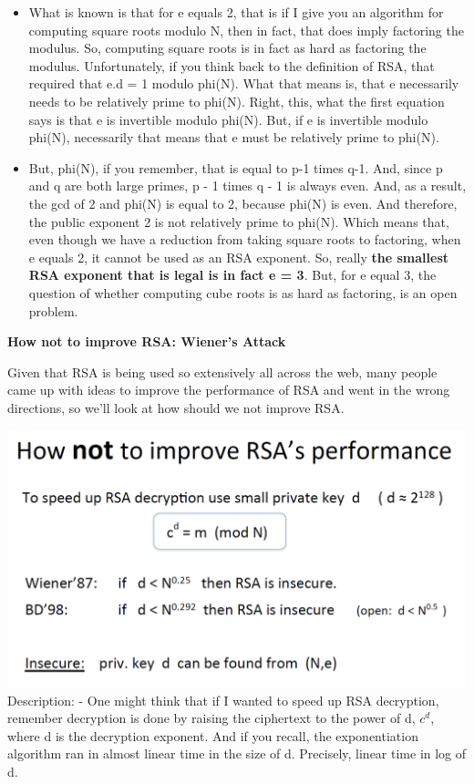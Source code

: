 \documentclass[11pt]{article}
\makeatletter
\def\maxwidth{\ifdim\Gin@nat@width>\linewidth\linewidth
    \else\Gin@nat@width\fi}
\let\Oldincludegraphics\includegraphics
\renewcommand{\includegraphics}[1]{\Oldincludegraphics[width=.8\maxwidth]{#1}}
\makeatother
\begin{document}
\begin{itemize}
\item
  What is known is that for e equals 2, that is if I give you an
  algorithm for computing square roots modulo N, then in fact, that does
  imply factoring the modulus. So, computing square roots is in fact as
  hard as factoring the modulus. Unfortunately, if you think back to the
  definition of RSA, that required that e.d = 1 modulo phi(N). What that
  means is, that e necessarily needs to be relatively prime to phi(N).
  Right, this, what the first equation says is that e is invertible
  modulo phi(N). But, if e is invertible modulo phi(N), necessarily that
  means that e must be relatively prime to phi(N).
\item
  But, phi(N), if you remember, that is equal to p-1 times q-1. And,
  since p and q are both large primes, p - 1 times q - 1 is always even.
  And, as a result, the gcd of 2 and phi(N) is equal to 2, because
  phi(N) is even. And therefore, the public exponent 2 is not relatively
  prime to phi(N). Which means that, even though we have a reduction
  from taking square roots to factoring, when e equals 2, it cannot be
  used as an RSA exponent. So, really \textbf{the smallest RSA exponent
  that is legal is in fact e = 3}. But, for e equal 3, the question of
  whether computing cube roots is as hard as factoring, is an open
  problem.
\end{itemize}

\textbf{How not to improve RSA: Wiener's Attack}

Given that RSA is being used so extensively all across the web, many
people came up with ideas to improve the performance of RSA and went in
the wrong directions, so we'll look at how should we not improve RSA.

\includegraphics{./Images/HowNotImproveRSA.png} Description: - One might
think that if I wanted to speed up RSA decryption, remember decryption
is done by raising the ciphertext to the power of d, \(c^{d}\), where d
is the decryption exponent. And if you recall, the exponentiation
algorithm ran in almost linear time in the size of d. Precisely, linear
time in log of d.
\end{document}
